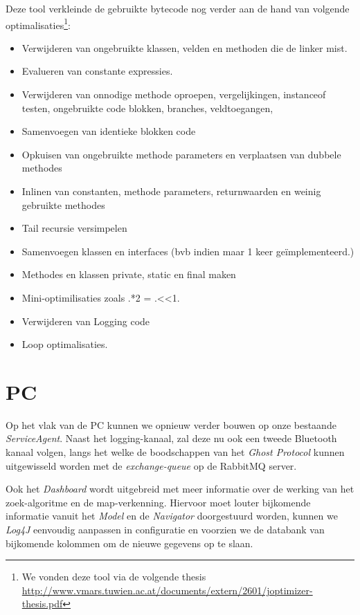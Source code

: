 \documentclass[12pt,a4paper]{report}
\begin{document}
Deze tool verkleinde de gebruikte bytecode nog verder aan de hand van volgende optimalisaties\footnote{We vonden deze tool via de volgende thesis \url{http://www.vmars.tuwien.ac.at/documents/extern/2601/joptimizer-thesis.pdf}}:

\begin{itemize}
\item Verwijderen van ongebruikte klassen, velden en methoden die de linker mist. 
\item Evalueren van constante expressies.
\item Verwijderen van onnodige methode oproepen, vergelijkingen, instanceof testen, ongebruikte code blokken, branches, veldtoegangen,
\item Samenvoegen van identieke blokken code
\item Opkuisen van ongebruikte methode parameters en verplaatsen van dubbele methodes
\item Inlinen van constanten, methode parameters, returnwaarden en weinig gebruikte methodes
\item Tail recursie versimpelen
\item Samenvoegen klassen en interfaces (bvb indien maar 1 keer ge\"implementeerd.)
\item Methodes en klassen private, static en final maken
\item Mini-optimilisaties zoals .*2 = .<<1.
\item Verwijderen van Logging code
\item Loop optimalisaties.
\end{itemize}

\section{PC}

Op het vlak van de PC kunnen we opnieuw verder bouwen op onze bestaande \emph{ServiceAgent}. Naast het logging-kanaal, zal deze nu ook een tweede Bluetooth kanaal volgen, langs het welke de boodschappen van het \emph{Ghost Protocol} kunnen uitgewisseld worden met de \emph{exchange-queue} op de RabbitMQ server.

Ook het \emph{Dashboard} wordt uitgebreid met meer informatie over de werking van het zoek-algoritme en de map-verkenning. Hiervoor moet louter bijkomende informatie vanuit het \emph{Model} en de \emph{Navigator} doorgestuurd worden, kunnen we \emph{Log4J} eenvoudig aanpassen in configuratie en voorzien we de databank van bijkomende kolommen om de nieuwe gegevens op te slaan.
\end{document}
